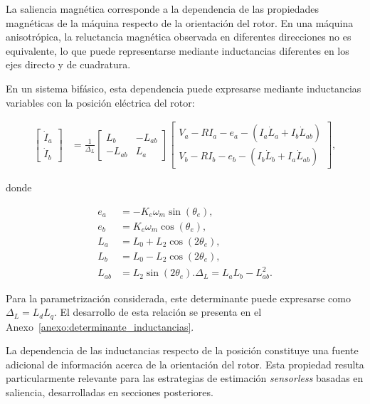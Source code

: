 La saliencia magnética corresponde a la dependencia de las propiedades 
magnéticas de la máquina respecto de la orientación del rotor. En una máquina 
anisotrópica, la reluctancia magnética observada en diferentes direcciones no 
es equivalente, lo que puede representarse mediante inductancias diferentes 
en los ejes directo y de cuadratura.

En un sistema bifásico, esta dependencia puede expresarse mediante 
inductancias variables con la posición eléctrica del rotor:

\begin{equation}
\label{eq:dinamica_electrica}
\begin{aligned}
    \begin{bmatrix} 
        \dot{I}_a \\ 
        \dot{I}_b 
    \end{bmatrix}
    &=
    \frac{1}{\Delta_L}
    \begin{bmatrix} 
        L_b & -L_{ab} \\ 
        -L_{ab} & L_a 
    \end{bmatrix}
    \begin{bmatrix} 
        V_{a} - R I_a - e_a -
        \left(I_a \dot{L}_a + I_b \dot{L}_{ab}\right) \\ 
        V_{b} - R I_b - e_b -
        \left(I_b \dot{L}_b + I_a \dot{L}_{ab}\right)
    \end{bmatrix},
\end{aligned}
\end{equation}

donde

\begin{equation}
\begin{aligned}
    e_a &= -K_e \omega_m \sin(\theta_e),\\
    e_b &= K_e \omega_m \cos(\theta_e),\\
    L_a &= L_0 + L_2\cos(2\theta_e),\\
    L_b &= L_0 - L_2\cos(2\theta_e),\\
    L_{ab} &= L_2\sin(2\theta_e).
    \Delta_L = L_aL_b-L_{ab}^{2}.
\end{aligned}
\end{equation}

Para la parametrización considerada, este determinante puede
expresarse como $\Delta_L=L_dL_q$. El desarrollo de esta relación
se presenta en el Anexo~\ref{anexo:determinante_inductancias}.

La dependencia de las inductancias respecto de la posición constituye una 
fuente adicional de información acerca de la orientación del rotor. Esta 
propiedad resulta particularmente relevante para las estrategias de 
estimación \textit{sensorless} basadas en saliencia, desarrolladas en 
secciones posteriores.

